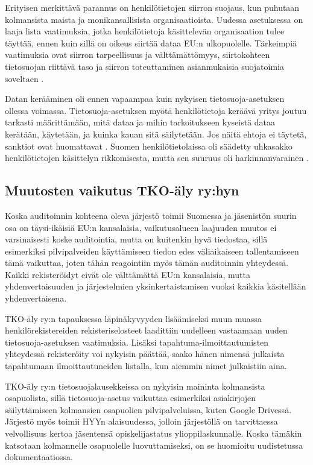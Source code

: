 \documentclass[finnish]{tktltiki}
\begin{document}
Erityisen merkittävä parannus on henkilötietojen siirron suojaus, kun puhutaan kolmansista maista ja monikansallisista organisaatioista. Uudessa asetuksessa on laaja lista vaatimuksia, jotka henkilötietoja käsittelevän organisaation tulee täyttää, ennen kuin sillä on oikeus siirtää dataa EU:n ulkopuolelle. Tärkeimpiä vaatimuksia ovat siirron tarpeellisuus ja välttämättömyys, siirtokohteen tietosuojan riittävä taso ja siirron toteuttaminen asianmukaisia suojatoimia soveltaen \cite{eu2016}. 

Datan kerääminen oli ennen vapaampaa kuin nykyisen tietosuoja-asetuksen ollessa voimassa. Tietosuoja-asetuksen myötä henkilötietoja keräävä yritys joutuu tarkasti määrittämään, mitä dataa ja mihin tarkoitukseen kyseistä dataa kerätään, käytetään, ja kuinka kauan sitä säilytetään. Jos näitä ehtoja ei täytetä, sanktiot ovat huomattavat \cite{eu2016}. Suomen henkilötietolaissa oli säädetty uhkasakko henkilötietojen käsittelyn rikkomisesta, mutta sen suuruus oli harkinnanvarainen \cite{henkilotieto}.

\subsection{Muutosten vaikutus TKO-äly ry:hyn}

Koska auditoinnin kohteena oleva järjestö toimii Suomessa ja jäsenistön suurin osa on täysi-ikäisiä EU:n kansalaisia, vaikutusalueen laajuuden muutos ei varsinaisesti koske auditointia, mutta on kuitenkin hyvä tiedostaa, sillä esimerkiksi pilvipalveiden käyttämiseen tiedon edes väliaikaiseen tallentamiseen tämä vaikuttaa, joten tähän reagointiin myös tämän auditoinnin yhteydessä. Kaikki rekisteröidyt eivät ole välttämättä EU:n kansalaisia, mutta yhdenvertaisuuden ja järjestelmien yksinkertaistamisen vuoksi kaikkia käsitellään yhdenvertaisena.

TKO-äly ry:n tapauksessa läpinäkyvyyden lisäämiseksi muun muassa henkilörekistereiden rekisteriselosteet laadittiin uudelleen vastaamaan uuden tietosuoja-asetuksen vaatimuksia. Lisäksi tapahtuma-ilmoittautumisten yhteydessä rekisteröity voi nykyisin päättää, saako hänen nimensä julkaista tapahtumaan ilmoittautuneiden listalla, kun aiemmin nimet julkaistiin aina.

TKO-äly ry:n tietosuojalausekkeissa on nykyisin maininta kolmansista osapuolista, sillä tietosuoja-asetus vaikuttaa esimerkiksi asiakirjojen säilyttämiseen kolmansien osapuolien pilvipalveluissa, kuten Google Drivessä. Järjestö myös toimii HYYn alaisuudessa, jolloin järjestöllä on tarvittaessa velvollisuus kertoa jäsentensä opiskelijastatus ylioppilaskunnalle. Koska tämäkin katsotaan kolmannelle osapuolelle luovuttamiseksi, on se huomioitu uudistetussa dokumentaatiossa.
\end{document}
